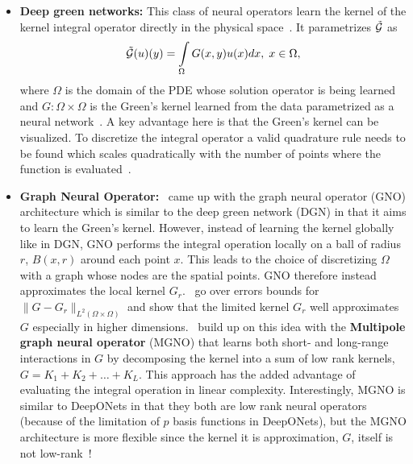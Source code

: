 \begin{itemize}
\item {\bf Deep green networks:} This class of neural operators learn the kernel of the kernel integral operator directly in the physical space~\citep{gin2021deepgreen, boulle2022data}. It parametrizes $\tilde{\mathcal{G}}$ as
\begin{align}
\tilde{\mathcal{G}}(u)(y) = \int\limits_{\Omega} G(x, y) u(x) dx, \; x \in \Omega,
\end{align}
where $\Omega$ is the domain of the PDE whose solution operator is being learned and $G: \Omega \times \Omega$ is the Green's kernel learned from the data parametrized as a neural network~\citep{boulle2022data}. A key advantage here is that the Green's kernel can be visualized. To discretize the integral operator a valid quadrature rule needs to be found which scales quadratically with the number of points where the function is evaluated~\citep{boulle2024mathematical}.

\item {\bf Graph Neural Operator:}~\citep{li2020neural} came up with the graph neural operator (GNO) architecture which is similar to the deep green network (DGN) in that it aims to learn the Green's kernel. However, instead of learning the kernel globally like in DGN, GNO performs the integral operation locally on a ball of radius $r$, $B(x, r)$ around each point $x$. This leads to the choice of discretizing $\Omega$ with a graph whose nodes are the spatial points. GNO therefore instead approximates the local kernel $G_r$.~\citep{li2020neural} go over errors bounds for $\|G - G_r\|_{L^2(\Omega \times \Omega)}$ and show that the limited kernel $G_r$ well approximates $G$ especially in higher dimensions.~\citep{li2020multipole} build up on this idea with the {\bf Multipole graph neural operator} (MGNO) that learns both short- and long-range interactions in $G$ by decomposing the kernel into a sum of low rank kernels, $G = K_1 + K_2 + \dots + K_L$. This approach has the added advantage of evaluating the integral operation in linear complexity. Interestingly, MGNO is similar to DeepONets in that they both are low rank neural operators (because of the limitation of $p$ basis functions in DeepONets), but the MGNO architecture is more flexible since the kernel it is approximation, $G$, itself is not low-rank~\citep{boulle2024mathematical}!


\end{itemize}
